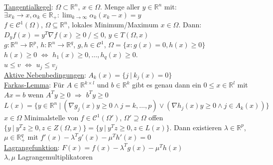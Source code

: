 \documentclass[a4paper]{article}
\newcommand{\ul}{\underline}
\begin{document}
\ul{Tangentialkegel}: $\Omega\subset\mathbb{R}^n$, $x\in\Omega$. Menge aller $y\in\mathbb{R}^n$ mit: $\exists x_k\rightarrow x,\alpha_k\in\mathbb{R}_+:\lim_{k\rightarrow\infty}\alpha_k(x_k-x)=y$\\
$f\in\mathcal{C}^1(\Omega)$, $\Omega\subseteq\mathbb{R}^n$, lokales Minimum/Maximum $x\in\Omega$. Dann: $D_yf(x)=y^T\nabla f(x)\geq 0\ / \leq 0$, $y\in T(\Omega,x)$\\
$g:\mathbb{R}^n\rightarrow\mathbb{R}^p$, $h:\mathbb{R}^n\rightarrow\mathbb{R}^q$, $g,h\in\mathcal{C}^1$, $\Omega=\{x:g(x)=0,h(x)\geq 0\}$\\
$h(x)\geq 0$ $\Leftrightarrow$ $h_1(x)\geq 0,\dots,h_q(x)\geq 0$.\\
$u\leq v$ $\Leftrightarrow$ $u_j\leq v_j$\\
\ul{Aktive Nebenbedingungen}: $A_k(x)=\{j\ \vert\ k_j(x)=0\}$\\
\ul{Farkas-Lemma}: Für $A\in\mathbb{R}^{k\times l}$ und $b\in\mathbb{R}^k$ gibt es genau dann ein $0\leq x\in\mathbb{R}^l$ mit $Ax=b$ wenn $A^Ty\geq 0$ $\Rightarrow$ $b^Ty\geq 0$\\
$L(x)=\{y\in\mathbb{R}^n\ \vert\ (\nabla g_j(x)y\geq 0 \wedge j=k,\dots,p)\vee(\nabla h_j(x)y\geq 0\wedge j\in A_k(x))\}$\\
$x\in\Omega$ Minimalstelle von $f\in\mathcal{C}^1(\Omega')$, $\Omega'\supseteq\Omega$ offen $\{y\ \vert\ y^Tz\geq 0,z\in Z(\Omega,x)\}=\{y\ \vert\ y^Tz\geq 0,z\in L(x)\}$. Dann existieren $\lambda\in\mathbb{R}^p$, $\mu\in\mathbb{R}_+^q$ mit $f'(x)-\lambda^Tg'(x)-\mu^Th'(x)=0$\\
\ul{Lagrangefunktion}: $F(x)=f(x)-\lambda^Tg(x)-\mu^Th(x)$\\
$\lambda,\mu$ Lagrangemultiplikatoren
\end{document}
